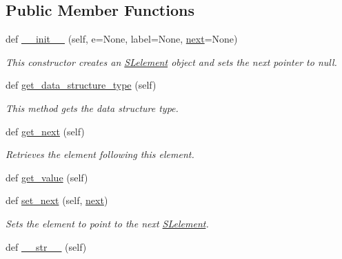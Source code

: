 \subsection*{Public Member Functions}
\begin{DoxyCompactItemize}
\item 
def \mbox{\hyperlink{class_bridges_1_1sl__element_1_1_s_lelement_ac764f5e21de5eeceb907f42a02eed226}{\+\_\+\+\_\+init\+\_\+\+\_\+}} (self, e=None, label=None, \mbox{\hyperlink{class_bridges_1_1sl__element_1_1_s_lelement_a96a8af8acbfe6f35cfdd1fd8ab16281d}{next}}=None)
\begin{DoxyCompactList}\small\item\em This constructor creates an \mbox{\hyperlink{class_bridges_1_1sl__element_1_1_s_lelement}{S\+Lelement}} object and sets the next pointer to null. \end{DoxyCompactList}\item 
def \mbox{\hyperlink{class_bridges_1_1sl__element_1_1_s_lelement_a64621ee79ab3420c38f11f75c8af94e4}{get\+\_\+data\+\_\+structure\+\_\+type}} (self)
\begin{DoxyCompactList}\small\item\em This method gets the data structure type. \end{DoxyCompactList}\item 
def \mbox{\hyperlink{class_bridges_1_1sl__element_1_1_s_lelement_a9767c8fd4d69a721014d659f9d07dfe8}{get\+\_\+next}} (self)
\begin{DoxyCompactList}\small\item\em Retrieves the element following this element. \end{DoxyCompactList}\item 
def \mbox{\hyperlink{class_bridges_1_1sl__element_1_1_s_lelement_a2f489dc7aa2602c4bbb295a1cb4d4efb}{get\+\_\+value}} (self)
\item 
def \mbox{\hyperlink{class_bridges_1_1sl__element_1_1_s_lelement_a1db3bb6e3360c62fa293c2e5df7a93b3}{set\+\_\+next}} (self, \mbox{\hyperlink{class_bridges_1_1sl__element_1_1_s_lelement_a96a8af8acbfe6f35cfdd1fd8ab16281d}{next}})
\begin{DoxyCompactList}\small\item\em Sets the element to point to the next \mbox{\hyperlink{class_bridges_1_1sl__element_1_1_s_lelement}{S\+Lelement}}. \end{DoxyCompactList}\item 
def \mbox{\hyperlink{class_bridges_1_1sl__element_1_1_s_lelement_ae5cba7dbda33046b4cb47b6f08e0245c}{\+\_\+\+\_\+str\+\_\+\+\_\+}} (self)

\end{DoxyCompactItemize}
